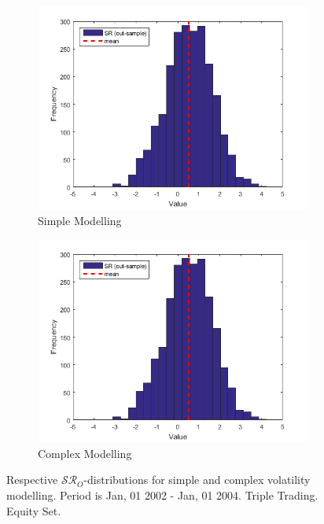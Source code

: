 \documentclass[11pt,a4,twosided,singlespacing,titlepagenumber=on]{scrreprt}
\numberwithin{equation}{chapter} %
\theoremstyle{remark}
\begin{document}
\begin{figure}[H]
    \centering
    \begin{subfigure}[t]{0.49\textwidth}
        \centering
        \includegraphics[width=1\textwidth]{res/params/4384_5114/sr}
        \caption{Simple Modelling}
    \end{subfigure}
    \begin{subfigure}[t]{0.49\textwidth}
        \centering
        \includegraphics[width=1\textwidth]{res/params/4384_5114/sr}
        \caption{Complex Modelling}
    \end{subfigure}
    \caption[]{Respective $\mathcal{SR}_O$-distributions for simple and complex volatility modelling. Period is Jan, 01 2002 - Jan, 01 2004. Triple Trading. Equity Set.}
    \label{fig:sharpe_ratio_comparison}
\end{figure}
\end{document}
